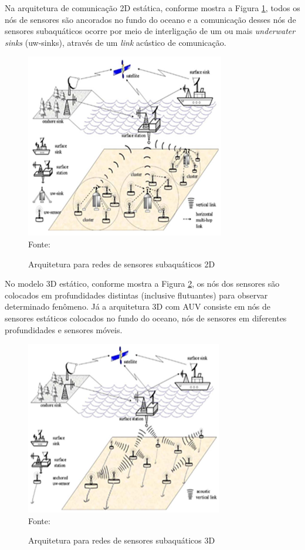 Na arquitetura de comunicação 2D estática, conforme mostra a Figura \ref{fig:arquitetura-rede-2d}, todos os nós de sensores são ancorados no fundo do oceano e a comunicação desses nós de sensores subaquáticos ocorre por meio de interligação de um ou mais \textit{underwater sinks} (uw-sinks), através de um \textit{link} acústico de comunicação. 

\begin{figure}[h]
	\centering
	\caption[Arquitetura para redes de sensores subaquáticos 2D]{Arquitetura para redes de sensores subaquáticos 2D}
	\label{fig:arquitetura-rede-2d}
	\includegraphics[width=0.5\linewidth]{images/arquitetura-rede-2d}\\
	\footnotesize Fonte: \cite{akyildiz2005underwater}
\end{figure}

No modelo 3D estático, conforme mostra a Figura \ref{fig:arquitetura-rede-3d}, os nós dos sensores são colocados em profundidades distintas (inclusive flutuantes) para observar determinado fenômeno. Já a arquitetura 3D com AUV consiste em nós de sensores estáticos colocados no fundo do oceano, nós de sensores em diferentes profundidades e sensores móveis.

\begin{figure}[h]
	\centering
	\caption[Arquitetura para redes de sensores subaquáticos 3D]{Arquitetura para redes de sensores subaquáticos 3D}
	\label{fig:arquitetura-rede-3d}
	\includegraphics[width=0.5\linewidth]{images/arquitetura-rede-3d}\\
	\footnotesize Fonte: \cite{akyildiz2005underwater}
\end{figure}

